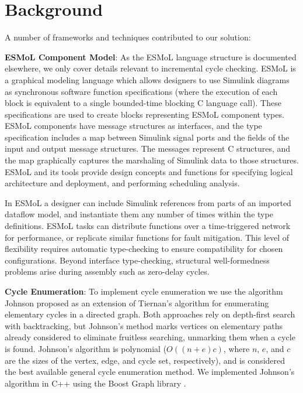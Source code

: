 \section{Background}
\label{section:background}


A number of frameworks and techniques contributed to our solution:

\textbf{ESMoL Component Model}: As the ESMoL language structure is documented elsewhere\cite{modeling:esmol_tr}, we only cover details relevant to incremental cycle checking.  ESMoL is a graphical
modeling language which allows designers to use Simulink diagrams as 
synchronous software function specifications (where the execution of each 
block is equivalent to a single bounded-time blocking C language call).  These
specifications are used to create blocks representing ESMoL component types.   
ESMoL components have message structures as interfaces, and the type
specification includes a map between Simulink signal ports and the 
fields of the input and output message structures.  The messages represent C structures, and the map graphically captures the marshaling of Simulink data to those structures.  ESMoL and its tools provide design concepts and functions for specifying  logical architecture and deployment, and performing scheduling analysis.

In ESMoL a designer can include Simulink references from
parts of an imported dataflow model, and instantiate them any number of 
times within the type definitions.  ESMoL tasks can distribute functions over a time-triggered network for performance, or replicate similar functions for fault mitigation.  
This level of flexibility requires automatic type-checking to ensure 
compatibility for chosen configurations.  Beyond interface type-checking, 
structural well-formedness problems arise during assembly such as zero-delay 
cycles.


\textbf{Cycle Enumeration}: To implement cycle enumeration we use the algorithm Johnson proposed as an extension of Tiernan's algorithm \cite{cycles:tiernan} for enumerating elementary cycles in a directed graph\cite{cycles:johnson75}.  Both approaches rely on depth-first search with backtracking, but Johnson's method marks vertices on elementary paths already considered to eliminate fruitless searching, unmarking them when a cycle is found.  Johnson's algorithm is polynomial ($O((n + e)c)$, where $n$, $e$, and $c$ are the sizes of the vertex, edge, and cycle set, respectively), and is considered the best available general cycle enumeration method\cite{cycles:mateti76}.  We implemented Johnson's algorithm in C++ using the Boost Graph library \cite{tools:boostgraph}.

